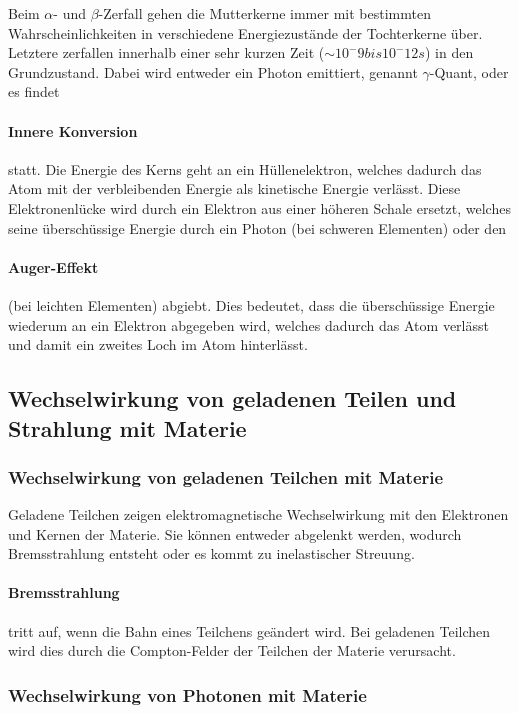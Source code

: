 Beim $\alpha$- und $\beta$-Zerfall gehen die Mutterkerne immer mit bestimmten Wahrscheinlichkeiten in verschiedene Energiezustände der Tochterkerne über. Letztere zerfallen innerhalb einer sehr kurzen Zeit ($\sim 10^-9 bis 10^-12 s$) in den Grundzustand. Dabei wird entweder ein Photon emittiert, genannt $\gamma$-Quant, oder es findet \paragraph{Innere Konversion} statt. Die Energie des Kerns geht an ein Hüllenelektron, welches dadurch das Atom mit der verbleibenden Energie als kinetische Energie verlässt. Diese Elektronenlücke wird durch ein Elektron aus einer höheren Schale ersetzt, welches seine überschüssige Energie durch ein Photon (bei schweren Elementen) oder den \paragraph{Auger-Effekt} (bei leichten Elementen) abgiebt.
Dies bedeutet, dass die überschüssige Energie wiederum an ein Elektron abgegeben wird, welches dadurch das Atom verlässt und damit ein zweites Loch im Atom hinterlässt.

\subsection{Wechselwirkung von geladenen Teilen und Strahlung mit Materie}
\subsubsection{Wechselwirkung von geladenen Teilchen mit Materie}

Geladene Teilchen zeigen elektromagnetische Wechselwirkung mit den Elektronen und Kernen der Materie. Sie können entweder abgelenkt werden, wodurch Bremsstrahlung entsteht oder es kommt zu inelastischer Streuung.

\paragraph{Bremsstrahlung} tritt auf, wenn die Bahn eines Teilchens geändert wird. Bei geladenen Teilchen wird dies durch die Compton-Felder der Teilchen der Materie verursacht.

\subsubsection{Wechselwirkung von Photonen mit Materie}

